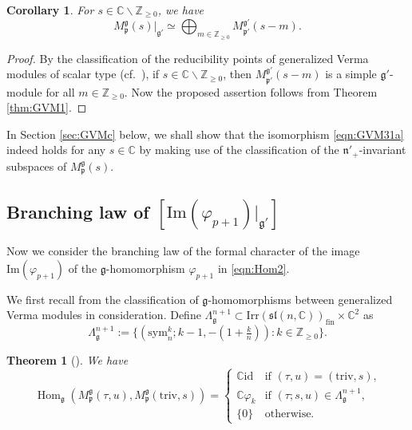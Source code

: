 \documentclass[reqno,11pt]{amsart}
\newtheorem{thm}[equation]{Theorem}
\newtheorem{cor}[equation]{Corollary}
\theoremstyle{remark}
\theoremstyle{definition}
\numberwithin{equation}{section}
\newcommand{\gL}{\Lambda}
\newcommand{\fg}{{\mathfrak g}}
\newcommand{\fn}{{\mathfrak n}}
\newcommand{\fp}{{\mathfrak p}}
\newcommand{\f}{\mathfrak}
\newcommand{\C}{\mathbb{C}}
\newcommand{\Z}{\mathbb{Z}}
\newcommand{\Hom}{\operatorname{Hom}}
\renewcommand{\Im}{\mathrm{Im}}
\newcommand{\Irr}{\mathrm{Irr}}
\newcommand{\triv}{\mathrm{triv}}
\newcommand{\fin}{\mathrm{fin}}
\newcommand{\sym}{\mathrm{sym}}
\newcommand{\id}{\mathrm{id}}
\newcommand{\Mp}{M^{\fg}_{\fp}}
\newcommand{\Mpp}{M^{\fg'}_{\fp'}}
\begin{document}
\begin{cor}\label{cor:GVM}
For $s \in \C\backslash \Z_{\geq 0}$, we have 
\begin{equation}\label{eqn:GVM31a}
\Mp(s)\vert_{\fg'} \simeq 
\bigoplus_{m \in \Z_{\geq 0}}\Mpp(s-m).
\end{equation}
\end{cor}

\begin{proof}
By the classification of the reducibility points
of generalized Verma modules of scalar type (cf.\ \cite{BX21, He15, HKZ19}),
if $s\in \C\backslash \Z_{\geq 0}$, then $\Mpp(s-m)$ is 
a simple $\fg'$-module for all $m\in \Z_{\geq 0}$. 
Now the proposed assertion follows from
Theorem \ref{thm:GVM1}.
\end{proof}

In Section \ref{sec:GVMc} below, 
we shall show that the isomorphism \eqref{eqn:GVM31a} indeed holds for any $s \in \C$
by making use of the classification of 
the $\fn'_+$-invariant subspaces of $\Mp(s)$.

\subsection{Branching law of $[\Im(\varphi_{p+1})\vert_{\fg'}]$}
\label{sec:GVMb}

Now we consider
the branching law of the formal character of 
the image $\Im(\varphi_{p+1})$ of the $\fg$-homomorphism
$\varphi_{p+1}$ in \eqref{eqn:Hom2}.

We first recall from \cite{KuOr24} the classification of 
$\fg$-homomorphisms between generalized Verma modules in consideration.
Define $\Lambda^{n+1}_{\fg} \subset 
\Irr(\f{sl}(n,\C))_\fin \times \C^2$ as
\begin{equation*}
\Lambda^{n+1}_{\fg}:=\{
(\sym_{n}^k; k-1, -(1+\tfrac{k}{n})) :  k\in \Z_{\geq 0}\}.
\end{equation*}

\begin{thm}[{\cite[Thm.\ 5.23]{KuOr24}}]\label{thm:KOHom2b}
We have
\begin{equation*}
\Hom_{\fg}(\Mp(\tau,u), \Mp(\triv, s))
=
\begin{cases}
\C\id & \text{if $(\tau, u) = (\triv, s)$,}\\
\C \varphi_k & \text{if $(\tau; s, u)\in \gL_{\fg}^{n+1}$,}\\
\{0\} & \text{otherwise.}
\end{cases}
\end{equation*}
\end{thm}
\end{document}
